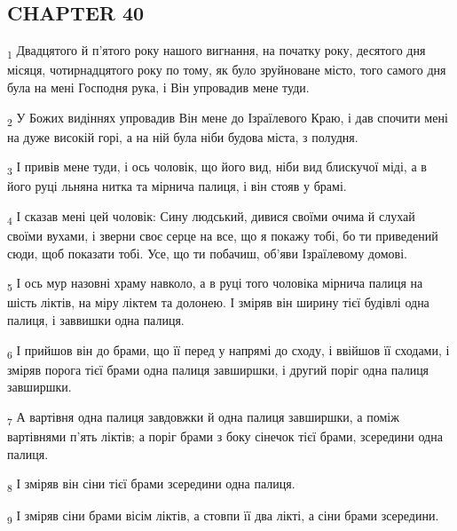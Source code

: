 \subsection{CHAPTER 40}
\begin{tcolorbox}
\textsubscript{1} Двадцятого й п'ятого року нашого вигнання, на початку року, десятого дня місяця, чотирнадцятого року по тому, як було зруйноване місто, того самого дня була на мені Господня рука, і Він упровадив мене туди.
\end{tcolorbox}
\begin{tcolorbox}
\textsubscript{2} У Божих видіннях упровадив Він мене до Ізраїлевого Краю, і дав спочити мені на дуже високій горі, а на ній була ніби будова міста, з полудня.
\end{tcolorbox}
\begin{tcolorbox}
\textsubscript{3} І привів мене туди, і ось чоловік, що його вид, ніби вид блискучої міді, а в його руці льняна нитка та мірнича палиця, і він стояв у брамі.
\end{tcolorbox}
\begin{tcolorbox}
\textsubscript{4} І сказав мені цей чоловік: Сину людський, дивися своїми очима й слухай своїми вухами, і зверни своє серце на все, що я покажу тобі, бо ти приведений сюди, щоб показати тобі. Усе, що ти побачиш, об'яви Ізраїлевому домові.
\end{tcolorbox}
\begin{tcolorbox}
\textsubscript{5} І ось мур назовні храму навколо, а в руці того чоловіка мірнича палиця на шість ліктів, на міру ліктем та долонею. І зміряв він ширину тієї будівлі одна палиця, і заввишки одна палиця.
\end{tcolorbox}
\begin{tcolorbox}
\textsubscript{6} І прийшов він до брами, що її перед у напрямі до сходу, і ввійшов її сходами, і зміряв порога тієї брами одна палиця завширшки, і другий поріг одна палиця завширшки.
\end{tcolorbox}
\begin{tcolorbox}
\textsubscript{7} А вартівня одна палиця завдовжки й одна палиця завширшки, а поміж вартівнями п'ять ліктів; а поріг брами з боку сінечок тієї брами, зсередини одна палиця.
\end{tcolorbox}
\begin{tcolorbox}
\textsubscript{8} І зміряв він сіни тієї брами зсередини одна палиця.
\end{tcolorbox}
\begin{tcolorbox}
\textsubscript{9} І зміряв сіни брами вісім ліктів, а стовпи її два лікті, а сіни брами зсередини.
\end{tcolorbox}
